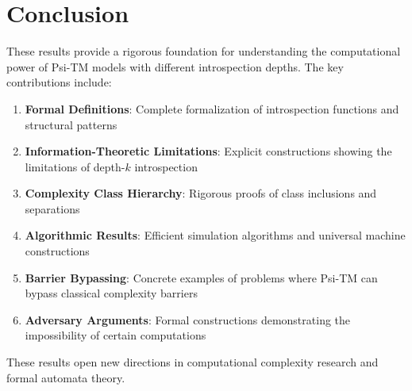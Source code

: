 \documentclass[11pt]{article}
\begin{document}
\section{Conclusion}

These results provide a rigorous foundation for understanding the computational power of Psi-TM models with different introspection depths. The key contributions include:

\begin{enumerate}
\item \textbf{Formal Definitions}: Complete formalization of introspection functions and structural patterns
\item \textbf{Information-Theoretic Limitations}: Explicit constructions showing the limitations of depth-$k$ introspection
\item \textbf{Complexity Class Hierarchy}: Rigorous proofs of class inclusions and separations
\item \textbf{Algorithmic Results}: Efficient simulation algorithms and universal machine constructions
\item \textbf{Barrier Bypassing}: Concrete examples of problems where Psi-TM can bypass classical complexity barriers
\item \textbf{Adversary Arguments}: Formal constructions demonstrating the impossibility of certain computations
\end{enumerate}

These results open new directions in computational complexity research and formal automata theory.
\end{document}
